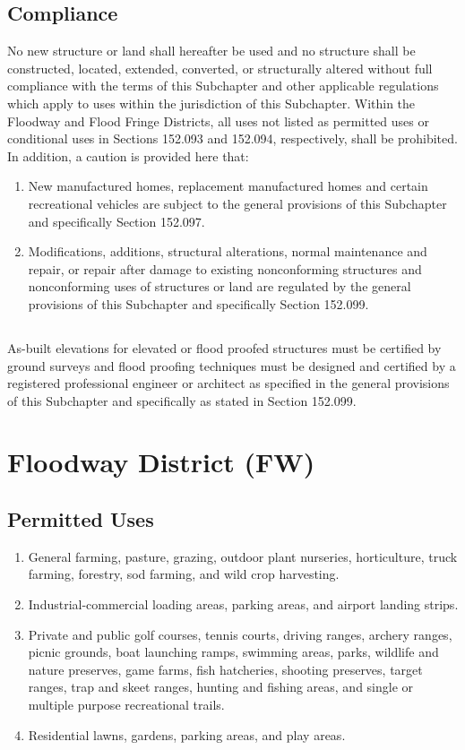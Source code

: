 \subsection{Compliance}
No new structure or land shall hereafter be used and no structure shall be constructed, located, extended, converted, or structurally altered without full compliance with the terms of this Subchapter and other applicable regulations which apply to uses within the jurisdiction of this Subchapter. Within the Floodway and Flood Fringe Districts, all uses not listed as permitted uses or conditional uses in Sections 152.093 and 152.094, respectively, shall be prohibited. In addition, a caution is provided here that:
\begin{enumerate}[{\indent}1)]
    \item New manufactured homes, replacement manufactured homes and certain recreational vehicles are subject to the general provisions of this Subchapter and specifically Section 152.097.
    \item Modifications, additions, structural alterations, normal maintenance and repair, or repair after damage to existing nonconforming structures and nonconforming uses of structures or land are regulated by the general provisions of this Subchapter and specifically Section 152.099.
\end{enumerate}
\subsection{}
As-built elevations for elevated or flood proofed structures must be certified by ground surveys and flood proofing techniques must be designed and certified by a registered professional engineer or architect as specified in the general provisions of this Subchapter and specifically as stated in Section 152.099.
\section{Floodway District (FW)}
\subsection{Permitted Uses}
\begin{enumerate}[{\indent}1)]
    \item General farming, pasture, grazing, outdoor plant nurseries, horticulture, truck farming, forestry, sod farming, and wild crop harvesting.
    \item Industrial-commercial loading areas, parking areas, and airport landing strips.
    \item Private and public golf courses, tennis courts, driving ranges, archery ranges, picnic grounds, boat launching ramps, swimming areas, parks, wildlife and nature preserves, game farms, fish hatcheries, shooting preserves, target ranges, trap and skeet ranges, hunting and fishing areas, and single or multiple purpose recreational trails.
    \item Residential lawns, gardens, parking areas, and play areas.
\end{enumerate}
